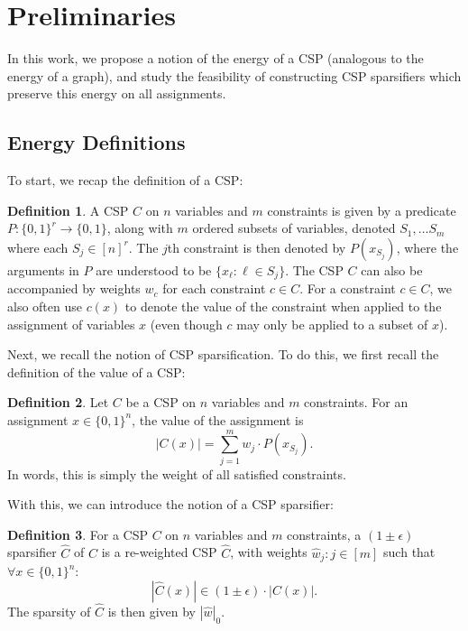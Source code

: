 \documentclass[11pt]{article}
\theoremstyle{definition}
\newtheorem{definition}{Definition}[section]
\newcommand{\zo}{\{0, 1\}}
\newcommand{\eps}{\epsilon}
\begin{document}
\section{Preliminaries}\label{sec:prelim}

In this work, we propose a notion of the energy of a CSP (analogous to the energy of a graph), and study the feasibility of constructing CSP sparsifiers which preserve this energy on all assignments. 



\subsection{Energy Definitions}

To start, we recap the definition of a CSP:

\begin{definition}
    A CSP $C$ on $n$ variables and $m$ constraints is given by a predicate $P: \zo^r \rightarrow \zo$, along with $m$ ordered subsets of variables, denoted $S_1, \dots S_m$ where each $S_j \in [n]^r$. The $j$th constraint is then denoted by $P(x_{S_j})$, where the arguments in $P$ are understood to be $\{x_{\ell}: \ell \in S_j\}$. The CSP $C$ can also be accompanied by weights $w_c$ for each constraint $c \in C$. For a constraint $c \in C$, we also often use $c(x)$ to denote the value of the constraint when applied to the assignment of variables $x$ (even though $c$ may only be applied to a subset of $x$). 
\end{definition}

Next, we recall the notion of CSP sparsification. To do this, we first recall the definition of the value of a CSP:

\begin{definition}
    Let $C$ be a CSP on $n$ variables and $m$ constraints. For an assignment $x \in \zo^n$, the value of the assignment is
    \[
    |C(x)| = \sum_{j = 1}^m w_j \cdot P(x_{S_j}).
    \]
    In words, this is simply the weight of all satisfied constraints. 
\end{definition}

With this, we can introduce the notion of a CSP sparsifier:

\begin{definition}
    For a CSP $C$ on $n$ variables and $m$ constraints, a $(1 \pm \eps)$ sparsifier $\hat{C}$ of $C$ is a re-weighted CSP $\hat{C}$, with weights $\hat{w}_j: j \in [m]$ such that $\forall x \in \zo^n$:
    \[
    |\hat{C}(x)| \in (1 \pm \eps) \cdot |C(x)|.
    \]
    The sparsity of $\hat{C}$ is then given by $|\hat{w}|_0$.
\end{definition}
\end{document}

